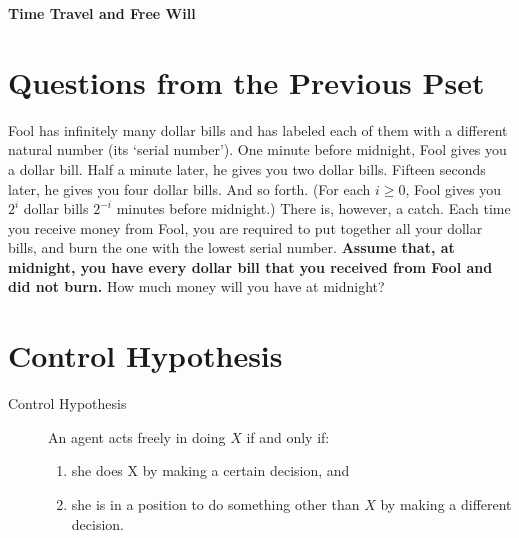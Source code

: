 \documentclass[12pt]{article}
\theoremstyle{definition}
\begin{document}




\begin{center}
{\Large \bf Time Travel and Free Will}
\end{center}

\smallskip

\section{Questions from the Previous Pset}

Fool has infinitely many dollar bills and has labeled each of them with a different natural number (its `serial number'). One minute before midnight, Fool gives you a dollar bill. Half a minute later, he gives you two dollar bills. Fifteen
seconds later, he gives you four dollar bills. And so forth. (For each $i\geq 0$, Fool gives you $2^i$ dollar bills $2^{-i}$ minutes before midnight.) There is, however, a
catch. Each time you receive money from Fool, you are required to put together all your dollar bills, and burn the one with the lowest serial number. \textbf{Assume that, at midnight, you have every dollar bill that you received from Fool and did not burn.} How much money will you have at midnight?

\section{Control Hypothesis}

\begin{description}
\item[Control Hypothesis] An agent acts freely in doing $X$ if and only if:
\begin{enumerate}
\item she does
X by making a certain decision, and
\item she is in a position to do something other than $X$ by making a different decision.
\end{enumerate} 
\end{description}
\end{document}
